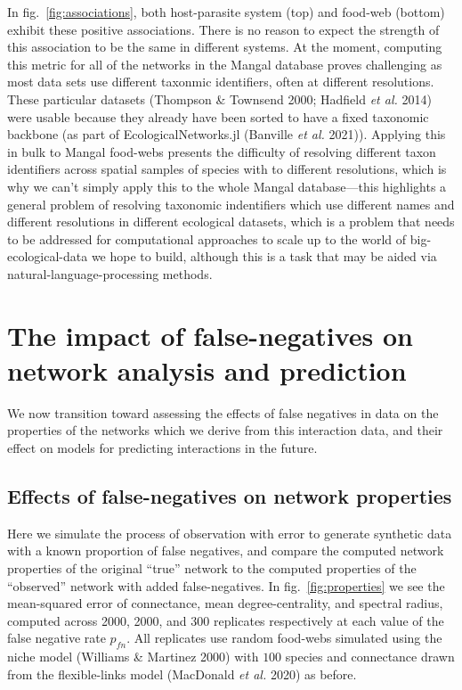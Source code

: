 \documentclass[11pt]{article}
\begin{document}
In fig.~\ref{fig:associations}, both host-parasite system (top) and
food-web (bottom) exhibit these positive associations. There is no
reason to expect the strength of this association to be the same in
different systems. At the moment, computing this metric for all of the
networks in the Mangal database proves challenging as most data sets use
different taxonmic identifiers, often at different resolutions. These
particular datasets (Thompson \& Townsend 2000; Hadfield \emph{et al.}
2014) were usable because they already have been sorted to have a fixed
taxonomic backbone (as part of EcologicalNetworks.jl (Banville \emph{et
al.} 2021)). Applying this in bulk to Mangal food-webs presents the
difficulty of resolving different taxon identifiers across spatial
samples of species with to different resolutions, which is why we can't
simply apply this to the whole Mangal database---this highlights a
general problem of resolving taxonomic indentifiers which use different
names and different resolutions in different ecological datasets, which
is a problem that needs to be addressed for computational approaches to
scale up to the world of big-ecological-data we hope to build, although
this is a task that may be aided via natural-language-processing
methods.

\hypertarget{the-impact-of-false-negatives-on-network-analysis-and-prediction}{%
\section{The impact of false-negatives on network analysis and
prediction}\label{the-impact-of-false-negatives-on-network-analysis-and-prediction}}

We now transition toward assessing the effects of false negatives in
data on the properties of the networks which we derive from this
interaction data, and their effect on models for predicting interactions
in the future.

\hypertarget{effects-of-false-negatives-on-network-properties}{%
\subsection{Effects of false-negatives on network
properties}\label{effects-of-false-negatives-on-network-properties}}

Here we simulate the process of observation with error to generate
synthetic data with a known proportion of false negatives, and compare
the computed network properties of the original ``true'' network to the
computed properties of the ``observed'' network with added
false-negatives. In fig.~\ref{fig:properties} we see the mean-squared
error of connectance, mean degree-centrality, and spectral radius,
computed across 2000, 2000, and 300 replicates respectively at each
value of the false negative rate \(p_{fn}\). All replicates use random
food-webs simulated using the niche model (Williams \& Martinez 2000)
with \(100\) species and connectance drawn from the flexible-links model
(MacDonald \emph{et al.} 2020) as before.
\end{document}
